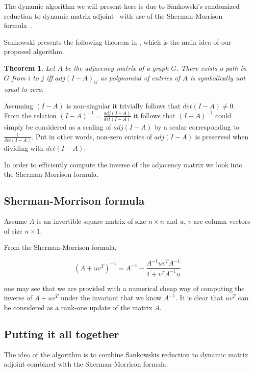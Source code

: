 \documentclass[a4paper,oneside,article,11pt]{memoir}
\newtheorem{thrm}{Theorem}
\begin{document}
The dynamic algorithm we will present here is due to Sankowski's randomized reduction to dynamic matrix adjoint~\cite{Reif1997347} with use of the Sherman-Morrison formula~\cite{lecnotes}.

Sankowski presents the following theorem in \cite{Reif1997347}, which is the main idea of our proposed algorithm.

\begin{thrm}
\label{thrm:sankowski-path}
Let $A$ be the adjacency matrix of a graph $G$. There exists a path in $G$ from $i$ to $j$ \textit{iff} $adj(I-A)_{ij}$ as polynomial of entries of $A$ is symbolically not equal to zero.
\end{thrm}

Assuming $(I-A)$ is non-singular it trivially follows that $det(I-A) \not = 0$. From the relation $(I-A)^{-1} = \frac{adj(I-A)}{det(I-A)}$ it follows that $(I-A)^{-1}$ could simply be considered as a scaling of $adj(I-A)$ by a scalar corresponding to $\frac{1}{det(I-A)}$. Put in other words, non-zero entries of $adj(I-A)$ is preserved when dividing with $det(I-A)$.

In order to efficiently compute the inverse of the adjacency matrix we look into the Sherman-Morrison formula.

\subsection{Sherman-Morrison formula}

Assume $A$ is an invertible square matrix of size $n \times n$ and $u$, $v$ are column vectors of size $n \times 1$. %

From the Sherman-Morrison formula,

\begin{equation} \label{eq:ShermanMorrison}
(A+uv^T)^{-1} = A^{-1} - \dfrac{A^{-1}uv^TA^{-1}}{1 + v^T A^{-1} u}
\end{equation}

one may see that we are provided with a numerical cheap way of computing the inverse of $A + uv^T$ under the invariant that we know $A^{-1}$. It is clear that $uv^T$ can be considered as a rank-one update of the matrix $A$.


\subsection{Putting it all together}
The idea of the algorithm is to combine Sankowskis reduction to dynamic matrix adjoint combined with the Sherman-Morrison formula.
\end{document}
